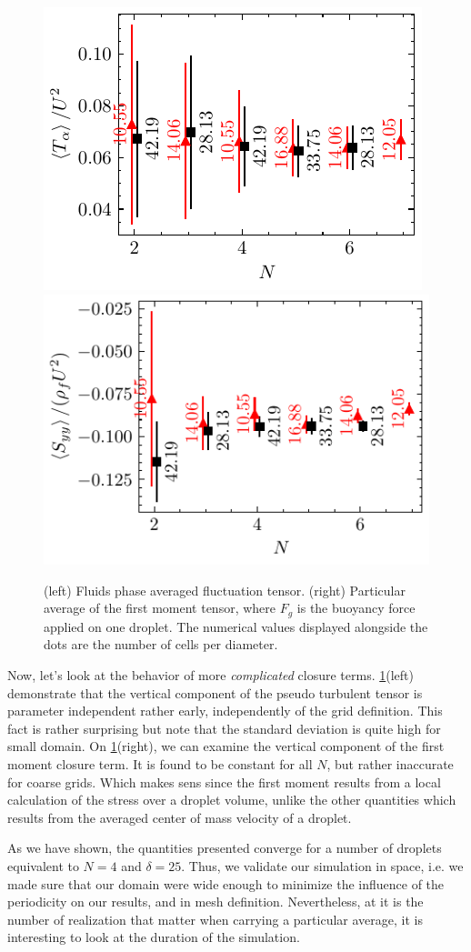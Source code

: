 \begin{figure}[h!]
    \centering
    \includegraphics[height= 0.3\textwidth]{image/VALIDATION/N_and_delta/PA_UpUp.pdf}
    \includegraphics[height= 0.3\textwidth]{image/VALIDATION/N_and_delta/Mh.pdf}
    \caption{(left) Fluids phase averaged fluctuation tensor.
            (right) Particular average of the first moment tensor, where $F_g$ is the buoyancy force applied on one droplet. 
            The numerical values displayed alongside the dots are the number of cells per diameter.}
    \label{fig:VALIDATION_Nd_2}
\end{figure}
Now, let's look at the behavior of more \textit{complicated} closure terms. 
\ref{fig:VALIDATION_Nd_2}(left) demonstrate that the vertical component of the pseudo turbulent tensor is parameter independent rather early, independently of the grid definition. 
This fact is rather surprising but note that the standard deviation is quite high for small domain. 
On \ref{fig:VALIDATION_Nd_2}(right), we can examine the vertical component of the first moment closure term. 
It is found to be constant for all $N$, but rather inaccurate for coarse grids. 
Which makes sens since the first moment results from a local calculation of the stress over a droplet volume, unlike the other quantities which results from the averaged center of mass velocity of a droplet. 

As we have shown, the quantities presented converge for a number of droplets equivalent to $N = 4$ and $\delta = 25$. 
Thus, we validate our simulation in space, i.e. we made sure that our domain were wide enough to minimize the influence of the periodicity on our results, and in mesh definition. 
Nevertheless, at it is the number of realization that matter when carrying a particular average, it is interesting to look at the duration of the simulation.

